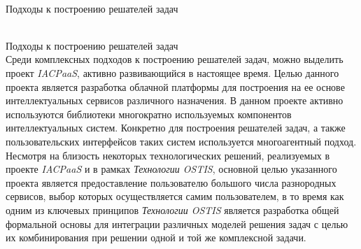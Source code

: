 \begin{frame}{\\Подходы к построению решателей задач}
	\topline
	\justifying
	\vspace*{\fill}\\
	\footnotesize{
		\begin{SCn}
			\begin{scnindent}
			\end{scnindent}
		\end{SCn}
	}
\end{frame}

\begin{frame}{\\Подходы к построению решателей задач}
	\topline
	\justifying
	\vspace*{\fill}\\
	\small{
		Среди комплексных подходов к построению решателей задач, можно выделить проект \textit{IACPaaS}, активно развивающийся в настоящее время. Целью данного проекта является разработка облачной платформы для построения на ее основе интеллектуальных сервисов различного назначения. В данном проекте активно используются библиотеки многократно используемых компонентов интеллектуальных систем. Конкретно для построения решателей задач, а также пользовательских интерфейсов таких систем используется многоагентный подход. Несмотря на близость некоторых технологических решений, реализуемых в проекте 	\textit{IACPaaS} и в рамках \textit{Технологии OSTIS}, основной целью указанного проекта является предоставление пользователю большого числа разнородных сервисов, выбор которых осуществляется самим пользователем, в то время как одним из ключевых принципов \textit{Технологии OSTIS} является разработка общей формальной основы для интеграции различных моделей решения задач с целью их комбинирования при решении одной и той же комплексной задачи.	
	}
\end{frame}

